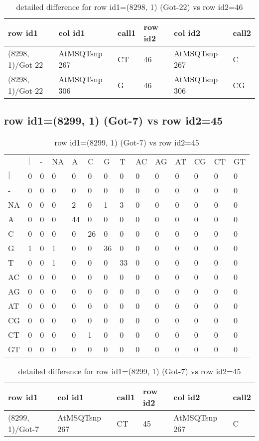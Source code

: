 \begin{center}
\begin{longtable}{|l|l|l|l|l|l|}
\caption{detailed difference for row id1=(8298, 1) (Got-22) vs row id2=46} \label{table_dm471}\\
\hline
row id1&col id1&call1&row id2&col id2&call2\\
\hline
(8298, 1)/Got-22&AtMSQTsnp 267&CT&46&AtMSQTsnp 267&C\\
(8298, 1)/Got-22&AtMSQTsnp 306&G&46&AtMSQTsnp 306&CG\\
\hline
\end{longtable}
\end{center}

\subsection{row id1=(8299, 1) (Got-7) vs row id2=45}
\begin{center}
\begin{longtable}{|l|l|l|l|l|l|l|l|l|l|l|l|l|l|}
\caption{row id1=(8299, 1) (Got-7) vs row id2=45} \label{table_dm472}\\
\hline
\\
\hline
&$|$&-&NA&A&C&G&T&AC&AG&AT&CG&CT&GT\\
$|$&0&0&0&0&0&0&0&0&0&0&0&0&0\\
-&0&0&0&0&0&0&0&0&0&0&0&0&0\\
NA&0&0&0&2&0&1&3&0&0&0&0&0&0\\
A&0&0&0&44&0&0&0&0&0&0&0&0&0\\
C&0&0&0&0&26&0&0&0&0&0&0&0&0\\
G&1&0&1&0&0&36&0&0&0&0&0&0&0\\
T&0&0&1&0&0&0&33&0&0&0&0&0&0\\
AC&0&0&0&0&0&0&0&0&0&0&0&0&0\\
AG&0&0&0&0&0&0&0&0&0&0&0&0&0\\
AT&0&0&0&0&0&0&0&0&0&0&0&0&0\\
CG&0&0&0&0&0&0&0&0&0&0&0&0&0\\
CT&0&0&0&0&1&0&0&0&0&0&0&0&0\\
GT&0&0&0&0&0&0&0&0&0&0&0&0&0\\
\hline
\end{longtable}
\end{center}

\begin{center}
\begin{longtable}{|l|l|l|l|l|l|}
\caption{detailed difference for row id1=(8299, 1) (Got-7) vs row id2=45} \label{table_dm473}\\
\hline
row id1&col id1&call1&row id2&col id2&call2\\
\hline
(8299, 1)/Got-7&AtMSQTsnp 267&CT&45&AtMSQTsnp 267&C\\
\hline
\end{longtable}
\end{center}

